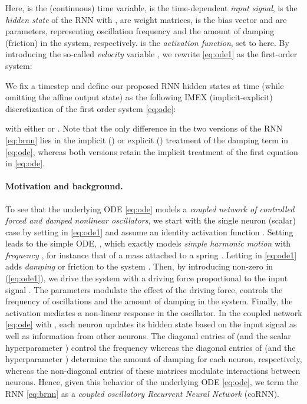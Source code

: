 \documentclass{article} \usepackage{iclr2021_conference,times}
\begin{document}
Here,  is the (continuous) time variable,  is the time-dependent \emph{input signal},  is the \emph{hidden state} of the RNN with ,  are weight matrices,
 is the bias vector and  are parameters, representing oscillation frequency and the amount of damping (friction) in the system, respectively.  is the \emph{activation function}, set to  here. By introducing the so-called \emph{velocity} variable , we rewrite \eqref{eq:ode1} as the first-order system:

We fix a timestep  and define our proposed RNN hidden states at time  (while omitting the affine output state) as the following IMEX (implicit-explicit) discretization of the first order system \eqref{eq:ode}:

with either  or . Note that the only difference in the two versions of the RNN \eqref{eq:brnn} lies in the implicit () or explicit () treatment of the damping term  in \eqref{eq:ode}, whereas both versions retain the implicit treatment of the first equation in \eqref{eq:ode}.
\paragraph{Motivation and background.} To see that the underlying ODE \eqref{eq:ode} models a \emph{coupled network of controlled forced and damped nonlinear oscillators}, we start with the single neuron (scalar) case by setting  in \eqref{eq:ode1} and assume an identity activation function . Setting  leads to the simple ODE, , which exactly models \emph{simple harmonic motion} with \emph{frequency} , for instance that of a mass attached to a spring \citep{GHbook}. Letting  in \eqref{eq:ode1} adds \emph{damping} or friction to the system \citep{GHbook}. Then, by introducing non-zero  in (\ref{eq:ode1}), we drive the system with a driving force proportional to the input signal . The parameters  modulate the effect of the driving force,  controls the frequency of oscillations and  the amount of damping in the system. Finally, the  activation mediates a non-linear response in the oscillator. In the coupled network \eqref{eq:ode} with , each neuron updates its hidden state based on the input signal as well as information from other neurons. The diagonal entries of  (and the scalar hyperparameter ) control the frequency whereas the diagonal entries of  (and the hyperparameter ) determine the amount of damping for each neuron, respectively, whereas the non-diagonal entries of these matrices modulate interactions between neurons. Hence, given this behavior of the underlying ODE \eqref{eq:ode}, we term the RNN \eqref{eq:brnn} as a \emph{coupled oscillatory Recurrent Neural Network} (coRNN).
\end{document}
